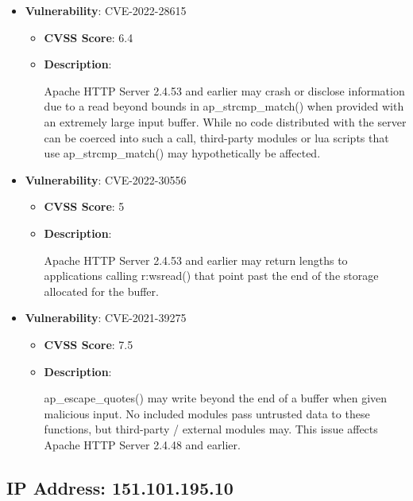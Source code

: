 \documentclass{article}
\begin{document}
\begin{itemize}
        \item \textbf{Vulnerability}: CVE-2022-28615
        \begin{itemize}
            \item \textbf{CVSS Score}:  6.4 
            \item \textbf{Description}:
            \parbox[t]{0.9\linewidth}{
                \ttfamily Apache HTTP Server 2.4.53 and earlier may crash or disclose information due to a read beyond bounds in ap\_strcmp\_match() when provided with an extremely large input buffer. While no code distributed with the server can be coerced into such a call, third-party modules or lua scripts that use ap\_strcmp\_match() may hypothetically be affected.
            }
        \end{itemize}
    
        \item \textbf{Vulnerability}: CVE-2022-30556
        \begin{itemize}
            \item \textbf{CVSS Score}:  5 
            \item \textbf{Description}:
            \parbox[t]{0.9\linewidth}{
                \ttfamily Apache HTTP Server 2.4.53 and earlier may return lengths to applications calling r:wsread() that point past the end of the storage allocated for the buffer.
            }
        \end{itemize}
    
        \item \textbf{Vulnerability}: CVE-2021-39275
        \begin{itemize}
            \item \textbf{CVSS Score}:  7.5 
            \item \textbf{Description}:
            \parbox[t]{0.9\linewidth}{
                \ttfamily ap\_escape\_quotes() may write beyond the end of a buffer when given malicious input. No included modules pass untrusted data to these functions, but third-party / external modules may. This issue affects Apache HTTP Server 2.4.48 and earlier.
            }
        \end{itemize}
    
\end{itemize}




\clearpage



\subsection*{IP Address: 151.101.195.10}
\end{document}
